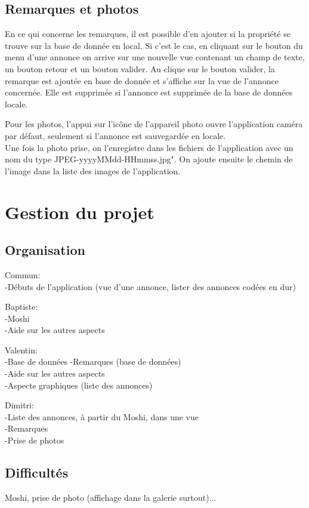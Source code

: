\documentclass[a4paper,12pt]{article} %
\begin{document}
\subsection{Remarques et photos}
En ce qui concerne les remarques, il est possible d'en ajouter si la propriété se trouve sur la base de donnée en local. Si c'est le cas, en cliquant sur le bouton du menu d'une annonce on arrive sur une nouvelle vue contenant un champ de texte, un bouton retour et un bouton valider.
Au clique sur le bouton valider, la remarque est ajoutée en base de donnée et s'affiche sur la vue de l'annonce concernée. Elle est supprimée si l'annonce est supprimée de la base de données locale.
\vspace{1cm}

Pour les photos, l'appui sur l'icône de l'appareil photo ouvre l'application caméra par défaut, seulement si l'annonce est sauvegardée en locale.\\
Une fois la photo prise, on l'enregistre dans les fichiers de l'application avec un nom du type JPEG-yyyyMMdd-HHmmss.jpg". On ajoute ensuite le chemin de l'image dans la liste des images de l'application.

\section{Gestion du projet}

\subsection{Organisation}
Commun:\\
-Débuts de l'application (vue d'une annonce, lister des annonces codées en dur)
\vspace{0.5cm}

Baptiste:\\
-Moshi\\
-Aide sur les autres aspects
\vspace{0.5cm}

Valentin:\\
-Base de données
-Remarques (base de données)\\
-Aide sur les autres aspects\\
-Aspects graphiques (liste des annonces)
\vspace{0.5cm}

Dimitri:\\
-Liste des annonces, à partir du Moshi, dans une vue\\
-Remarques\\
-Prise de photos

\subsection{Difficultés}
Moshi, prise de photo (affichage dans la galerie surtout)...
\end{document}
